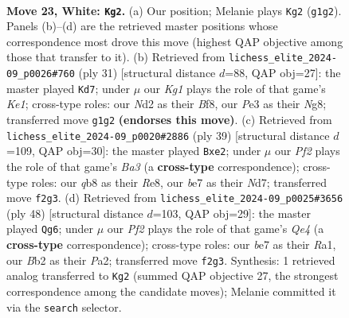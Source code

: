 \documentclass[11pt]{article}
\begin{document}
\clearpage

\begin{figure}[p]\centering
\begin{subfigure}{0.46\textwidth}\centering
\resizebox{\linewidth}{!}{%
\newchessgame
\chessboard[
  setfen={rqb1k2r/p3b1pp/1p6/n2p1p2/Pp1P3P/4P1nB/RBQN1P2/1N2R1K1 w - - 0 23},
  showmover=false,
  pgfstyle=straightmove, color=movearrow, markmove={g1-g2}
]}
\caption{}
\end{subfigure}\hfill
\begin{subfigure}{0.46\textwidth}\centering
\resizebox{\linewidth}{!}{%
\newchessgame
\chessboard[
  setfen={r3kbnr/1p4p1/1qn1p3/pN1p1b2/P2P1B1p/7P/1P2B1P1/R2QNRK1 b kq - 3 16},
  showmover=false,
  pgfstyle=straightmove, color=movearrow, markmove={e8-d7}
]}
\caption{}
\end{subfigure}
\\[4pt]
\begin{subfigure}{0.46\textwidth}\centering
\resizebox{\linewidth}{!}{%
\newchessgame
\chessboard[
  setfen={r3r1k1/3n1pp1/b1pqn2p/p7/Np1PP3/7P/PPBQNRP1/3R2K1 b - - 4 20},
  showmover=false,
  pgfstyle=straightmove, color=movearrow, markmove={a6-e2}
]}
\caption{}
\end{subfigure}\hfill
\begin{subfigure}{0.46\textwidth}\centering
\resizebox{\linewidth}{!}{%
\newchessgame
\chessboard[
  setfen={r1b3nk/pp3r2/3p3p/2pP3q/2P1QBp1/5n2/PbB1NPNP/R4R1K w - - 0 25},
  showmover=false,
  pgfstyle=straightmove, color=movearrow, markmove={e4-g6}
]}
\caption{}
\end{subfigure}
\caption{\textbf{Move 23, White: \texttt{Kg2}.} (a) Our position; Melanie plays \texttt{Kg2} (\texttt{g1g2}). Panels (b)--(d) are the retrieved master positions whose correspondence most drove this move (highest QAP objective among those that transfer to it). (b) Retrieved from \texttt{lichess\_elite\_2024-09\_p0026\#760} (ply 31) [structural distance $d$=88, QAP obj=27]: the master played \texttt{Kd7}; under $\mu$ our \emph{Kg1} plays the role of that game's \emph{Ke1}; cross-type roles: our \emph{N}d2 as their \emph{B}f8, our \emph{P}e3 as their \emph{N}g8; transferred move \texttt{g1g2} \textbf{(endorses this move)}. (c) Retrieved from \texttt{lichess\_elite\_2024-09\_p0020\#2886} (ply 39) [structural distance $d$=109, QAP obj=30]: the master played \texttt{Bxe2}; under $\mu$ our \emph{Pf2} plays the role of that game's \emph{Ba3} (a \textbf{cross-type} correspondence); cross-type roles: our \emph{q}b8 as their \emph{R}e8, our \emph{b}e7 as their \emph{N}d7; transferred move \texttt{f2g3}. (d) Retrieved from \texttt{lichess\_elite\_2024-09\_p0025\#3656} (ply 48) [structural distance $d$=103, QAP obj=29]: the master played \texttt{Qg6}; under $\mu$ our \emph{Pf2} plays the role of that game's \emph{Qe4} (a \textbf{cross-type} correspondence); cross-type roles: our \emph{b}e7 as their \emph{R}a1, our \emph{B}b2 as their \emph{P}a2; transferred move \texttt{f2g3}. Synthesis: 1 retrieved analog transferred to \texttt{Kg2} (summed QAP objective 27, the strongest correspondence among the candidate moves); Melanie committed it via the \texttt{search} selector.}
\label{fig:thought-m44}
\end{figure}
\end{document}
